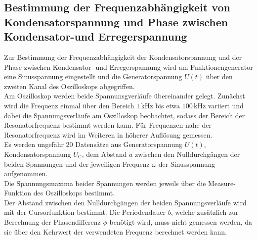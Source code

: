 \subsection{Bestimmung der Frequenzabhängigkeit von Kondensatorspannung und Phase zwischen Kondensator-und Erregerspannung}
Zur Bestimmung der Frequenzabhängigkeit der Kondensatorspannung und der Phase zwischen Kondensator- und Erregerspannung wird am Funktionengenerator eine Sinusspannung eingestellt und die Generatorspannung $U(t)$ über den zweiten Kanal des Oszilloskops abgegriffen.\\
Am Oszilloskop werden beide Spannunsgverläufe übereinander gelegt.
Zunächst wird die Frequenz einmal über den Bereich $1 \,\si{\kilo\Hz}$ bis etwa $100 \,\si{\kilo\Hz}$ variiert und dabei die Spannungsverläufe am Oszilloskop beobachtet, sodass der Bereich der Resonatorfrequenz bestimmt werden kann.
Für Frequenzen nahe der Resonatorfrequenz wird im Weiteren in höherer Auflösung gemessen.\\
Es werden ungefähr 20 Datensätze aus Generatorspannung $U(t)$, Kondensatorspannung $U_\text{C}$, dem Abstand $a$ zwischen den Nulldurchgängen der beiden Spannungen und der jeweiligen Frequenz $\omega$ der Sinusspannung aufgenommen.\\
Die Spannungsmaxima beider Spannungen werden jeweils über die Measure-Funktion des Oszilloskops bestimmt.\\
Der Abstand zwischen den Nulldurchgängen der beiden Spannungsverläufe wird mit der Cursorfunktion bestimmt.
Die Periodendauer $b$, welche zusätzlich zur Berechnung der Phasendifferenz $\phi$ benötigt wird, muss nicht gemessen werden, da sie über den Kehrwert der verwendeten Frequenz berechnet werden kann.
